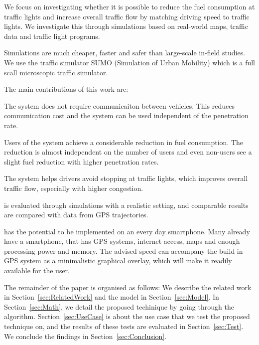 We focus on investigating whether it is possible to reduce the fuel consumption at traffic lights and increase overall traffic flow by matching driving speed to traffic lights. 
We investigate this through simulations based on real-world maps, traffic data and traffic light programs.

Simulations are much cheaper, faster and safer than large-scale in-field studies. 
We use the traffic simulator SUMO (Simulation of Urban Mobility)\cite{sumo} which is a full scall microscopic traffic simulator.

The main contributions of this work are:
\begin{enumerate*}
\item The system does not require communicaiton between vehicles. This reduces communication cost and the system can be used independent of the penetration rate.
\item Users of the system achieve a considerable reduction in fuel consumption. The reduction is almost independent on the number of users and even non-users see a slight fuel reduction with higher penetration rates.
\item The system helps drivers avoid stopping at traffic lights, which improves overall traffic flow, especially with higher congestion.
\item \tech is evaluated through simulations with a realistic setting, and comparable results are compared with data from GPS trajectories.
\end{enumerate*}

\tech has the potential to be implemented on an every day smartphone. 
Many already have a smartphone, that has GPS systems, internet access, maps and enough processing power and memory.
The advised speed can accompany the build in GPS system as a minimalistic graphical overlay, which will make it readily available for the user.

The remainder of the paper is organised as follows: 
We describe the related work in Section~\ref{sec:RelatedWork} and the model in Section~\ref{sec:Model}. 
In Section~\ref{sec:Math}, we detail the proposed techinique by going through the algorithm.
Section~\ref{sec:UseCase} is about the use case that we test the proposed technique on, and the results of these tests are evaluated in Section~\ref{sec:Test}. 
We conclude the findings in Section~\ref{sec:Conclusion}.





